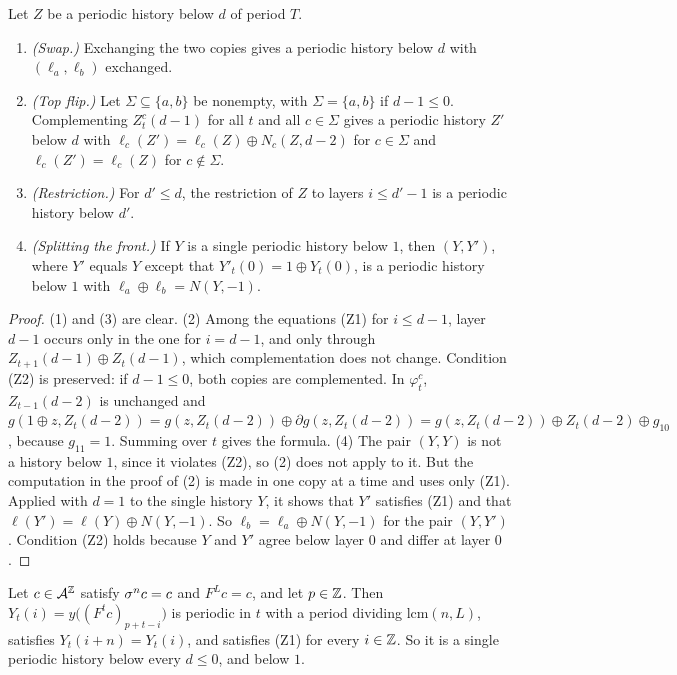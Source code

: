 \begin{lemma}\label{pm:lem:ops}
Let $Z$ be a periodic history below $d$ of period $T$.
\begin{enumerate}
\item \emph{(Swap.)} Exchanging the two copies gives a periodic history below $d$ with $(\ell_a,\ell_b)$ exchanged.
\item \emph{(Top flip.)} Let $\Sigma\subseteq\{a,b\}$ be nonempty, with $\Sigma=\{a,b\}$ if $d-1\le0$. Complementing $Z^c_t(d-1)$ for all $t$ and all $c\in\Sigma$ gives a periodic history $Z'$ below $d$ with $\ell_c(Z')=\ell_c(Z)\oplus N_c(Z,d-2)$ for $c\in\Sigma$ and $\ell_c(Z')=\ell_c(Z)$ for $c\notin\Sigma$.
\item \emph{(Restriction.)} For $d'\le d$, the restriction of $Z$ to layers $i\le d'-1$ is a periodic history below $d'$.
\item \emph{(Splitting the front.)} If $Y$ is a single periodic history below $1$, then $(Y,Y')$, where $Y'$ equals $Y$ except that $Y'_t(0)=1\oplus Y_t(0)$, is a periodic history below $1$ with $\ell_a\oplus\ell_b=N(Y,-1)$.
\end{enumerate}
\end{lemma}

\begin{proof}
(1) and (3) are clear. (2) Among the equations (Z1) for $i\le d-1$, layer $d-1$ occurs only in the one for $i=d-1$, and only through $Z_{t+1}(d-1)\oplus Z_t(d-1)$, which complementation does not change. Condition (Z2) is preserved: if $d-1\le0$, both copies are complemented. In $\varphi^c_t$, $Z_{t-1}(d-2)$ is unchanged and $g(1\oplus z,Z_t(d-2))=g(z,Z_t(d-2))\oplus\partial g(z,Z_t(d-2))=g(z,Z_t(d-2))\oplus Z_t(d-2)\oplus g_{10}$, because $g_{11}=1$. Summing over $t$ gives the formula. (4) The pair $(Y,Y)$ is not a history below $1$, since it violates (Z2), so (2) does not apply to it. But the computation in the proof of (2) is made in one copy at a time and uses only (Z1). Applied with $d=1$ to the single history $Y$, it shows that $Y'$ satisfies (Z1) and that $\ell(Y')=\ell(Y)\oplus N(Y,-1)$. So $\ell_b=\ell_a\oplus N(Y,-1)$ for the pair $(Y,Y')$. Condition (Z2) holds because $Y$ and $Y'$ agree below layer $0$ and differ at layer $0$.
\end{proof}

\begin{lemma}\label{pm:lem:tail}
Let $c\in\mathcal{A}^{\mathbb{Z}}$ satisfy $\sigma^nc=c$ and $F^Lc=c$, and let $p\in\mathbb{Z}$. Then $Y_t(i)=y\bigl((F^tc)_{p+t-i}\bigr)$ is periodic in $t$ with a period dividing $\mathrm{lcm}(n,L)$, satisfies $Y_t(i+n)=Y_t(i)$, and satisfies (Z1) for every $i\in\mathbb{Z}$. So it is a single periodic history below every $d\le0$, and below $1$.
\end{lemma}

